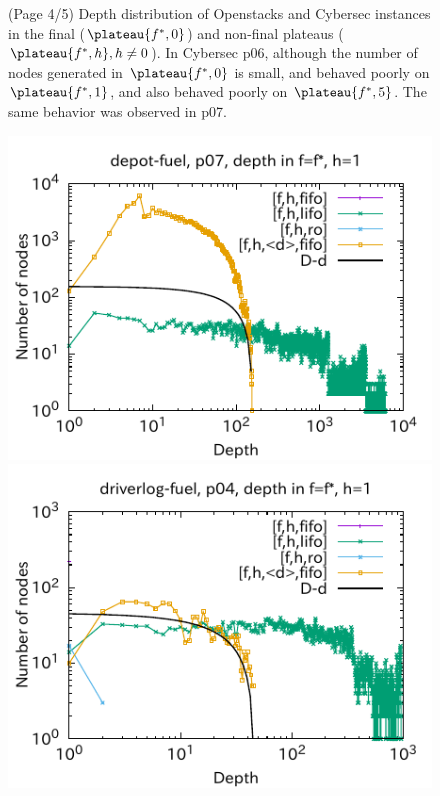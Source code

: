 \begin{figure}[htbp]
 \caption{(Page 4/5) Depth distribution of Openstacks and Cybersec instances in the final ($\plateau{f^*,0}$) and non-final plateaus ($\plateau{f^*,h}, h\not=0$). In Cybersec p06, although the number of nodes generated in $\plateau{f^*,0}$ is small, \fifo and \ro behaved poorly on $\plateau{f^*,1}$, and also \lifo behaved poorly on $\plateau{f^*,5}$. The same behavior was observed in p07.}
 \label{fig:depth-histogram4}
\end{figure}

\begin{figure}[htbp]
\includegraphics{img/output-lmcut/depot-fuel/p07-1.pdf}
\includegraphics{img/output-lmcut/driverlog-fuel/p04-1.pdf}

\end{figure}
